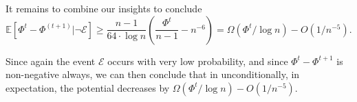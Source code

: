 It remains to combine our insights to conclude
\[
\mathbb{E}[\Phi^{t} - \Phi^{(t+1)} | \neg \mathcal{E}] \geq \frac{n-1}{64 \cdot \log n} \left( \frac{\Phi^t}{n-1} - n^{-6} \right) = \Omega(\Phi^t / \log n) - O(1/n^{-5}).
\]

Since again the event $\mathcal{E}$ occurs with very low probability, and since $\Phi^t - \Phi^{t+1}$ is non-negative always, we can then conclude that in unconditionally, in expectation, the potential decreases by $\Omega(\Phi^t / \log n) - O(1/n^{-5}).$


